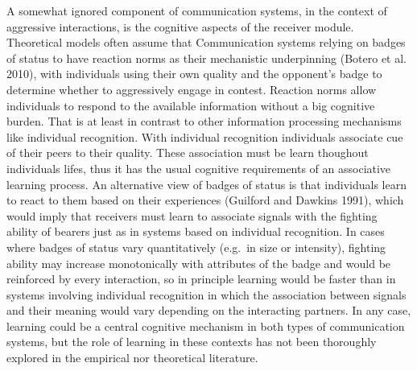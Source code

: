 \documentclass[
  12pt,
]{article}
\begin{document}
A somewhat ignored component of communication systems, in the context of
aggressive interactions, is the cognitive aspects of the receiver
module. Theoretical models often assume that Communication systems
relying on badges of status to have reaction norms as their mechanistic
underpinning (Botero et al. 2010), with individuals using their own
quality and the opponent's badge to determine whether to aggressively
engage in contest. Reaction norms allow individuals to respond to the
available information without a big cognitive burden. That is at least
in contrast to other information processing mechanisms like individual
recognition. With individual recognition individuals associate cue of
their peers to their quality. These association must be learn thoughout
individuals lifes, thus it has the usual cognitive requirements of an
associative learning process. An alternative view of badges of status is
that individuals learn to react to them based on their experiences
(Guilford and Dawkins 1991), which would imply that receivers must learn
to associate signals with the fighting ability of bearers just as in
systems based on individual recognition. In cases where badges of status
vary quantitatively (e.g.~in size or intensity), fighting ability may
increase monotonically with attributes of the badge and would be
reinforced by every interaction, so in principle learning would be
faster than in systems involving individual recognition in which the
association between signals and their meaning would vary depending on
the interacting partners. In any case, learning could be a central
cognitive mechanism in both types of communication systems, but the role
of learning in these contexts has not been thoroughly explored in the
empirical nor theoretical literature.
\end{document}
